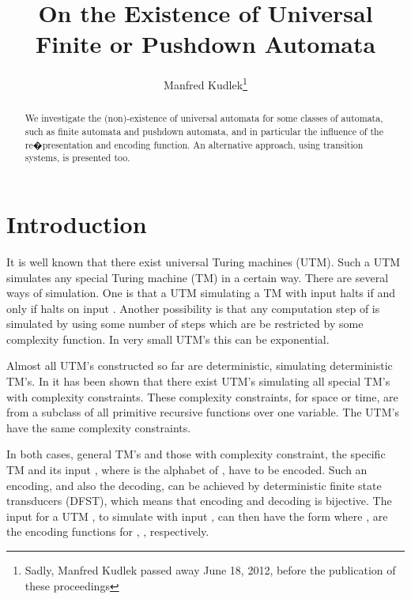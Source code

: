 \documentclass{eptcs}
\begin{document}
\title{On the Existence of Universal Finite or Pushdown Automata
}
\def\titlerunning{On the Existence of Universal Finite and Pushdown Automata}
\author{Manfred Kudlek\footnote{
Sadly, Manfred Kudlek passed away June 18, 2012, before the publication of these proceedings}
}
\def\authorrunning{Kudlek}
\date{}
\maketitle



\begin{abstract}
We investigate the (non)-existence of universal automata for some classes
of automata, such as finite automata and pushdown automata, and
 in particular the influence of the re�presentation and encoding function.
An alternative approach, using transition systems, is presented too.
\end{abstract}

\section{Introduction}

It is well known that there exist universal Turing machines (UTM).
Such a UTM simulates any special Turing machine (TM)  in a certain
way. There are several ways of simulation. One is that a UTM  
simulating a TM  with input  halts if and only if  halts
on input . Another possibility is that any computation step of 
is simulated by  using some number of steps which are be restricted
by some complexity function. In very small UTM's this can be
exponential.

Almost all UTM's constructed so far are deterministic, simulating
deterministic TM's. In \cite{KM} it has been shown that there exist UTM's simulating
all special TM's with complexity constraints. These complexity constraints,
for space or time, are from a subclass of all primitive recursive functions
over one variable. The UTM's have the same complexity constraints.

In both cases, general TM's and those with complexity constraint,
the specific TM  and its input , where  is
the alphabet of , have to be encoded. Such an encoding, and also the
decoding, can be achieved by deterministic finite state transducers (DFST),
which means that encoding and decoding is bijective. The input for a
UTM , to simulate  with input , can then have the form
 where ,  are the encoding functions for , ,
respectively.
\end{document}
